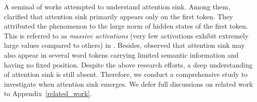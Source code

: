 \documentclass{article} \usepackage{iclr2025_conference,times}
\begin{document}
A seminal of works attempted to understand attention sink. Among them, \citet{cancedda2024spectral} clarified that attention sink primarily appears only on the first token. They attributed the phenomenon to the large norm of hidden states of the first token. This is referred to as \textit{massive activations} (very few activations exhibit extremely large values compared to others) in \citet{sun2024massive}. Besides, \citet{sun2024massive,yu2024unveiling} observed that attention sink may also appear in several word tokens carrying limited semantic information and having no fixed position. Despite the above research efforts, a deep understanding of attention sink is still absent. Therefore, we conduct a comprehensive study to investigate when attention sink emerges. We defer full discussions on related work to Appendix~\ref{related_work}.
\end{document}
